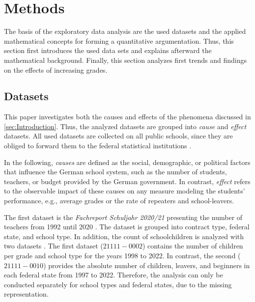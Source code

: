 \section{Methods}
The basis of the exploratory data analysis are the used datasets and the applied mathematical concepts for forming a quantitative argumentation. Thus, this section first introduces the used data sets and explains afterward the mathematical background. Finally, this section analyzes first trends and findings on the effects of increasing grades.

\subsection{Datasets}
This paper investigates both the causes and effects of the phenomena discussed in \autoref{sec:Introduction}. Thus, the analyzed datasets are grouped into \emph{cause} and \emph{effect} datasets. All used datasets are collected on all public schools, since they are obliged to forward them to the federal statistical institutions \cite{statistische_bundesamt_statistisches_2024,kultusminister_konferenz_abiturnoten_nodate}.

In the following, \emph{causes} are defined as the social, demographic, or political factors that  influence the German school system, such as the number of students, teachers, or budget provided by the German government. In contrast, \emph{effect} refers to the observable impact of these causes on any measure modeling the students' performance, e.g., average grades or the rate of repeaters and school-leavers.

The first dataset is the \textit{Fachreport Schuljahr 2020/21} presenting the number of teachers from 1992 until 2020 \cite{statistische_bundesamt_allgemeinbildende_2022}. The dataset is grouped into contract type, federal state, and school type. In addition, the count of schoolchildren is analyzed with two datasets \cite{statistische_bundesamt_statistisches_2024}. The first dataset (\href{https://www-genesis.destatis.de/genesis//online?operation=table&code=21111-0002&bypass=true&levelindex=0&levelid=1706352545984#abreadcrumb}{$21111-0002$}) contains the number of children per grade and school type  for the years 1998 to 2022. In contrast, the second (\href{https://www-genesis.destatis.de/genesis//online?operation=table&code=21111-0010&bypass=true&levelindex=0&levelid=1706352536762#abreadcrumb}{$21111-0010$}) provides the absolute number of children, leavers, and beginners in each federal state from 1997 to 2022. Therefore, the analysis can only be conducted separately for school types and federal states, due to the missing representation.

